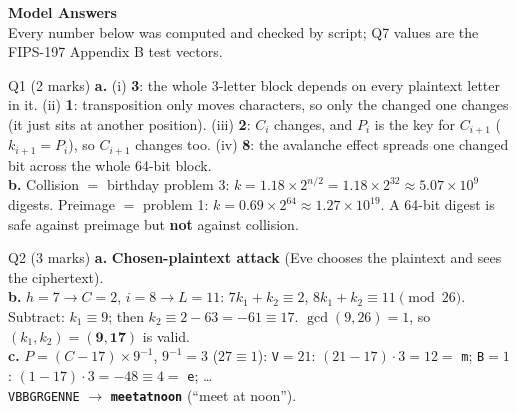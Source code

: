 \documentclass[11pt,a4paper]{article}
\newcommand{\ttx}[1]{\texttt{#1}}
\begin{document}
\clearpage
{\solfont
\pagecolor{tbg}\color{tfg}
{\Large\bfseries\color{acc} Model Answers}\\[2pt]
{\small Every number below was computed and checked by script; Q7 values are the FIPS-197 Appendix B test vectors.}

\begin{sol}{Q1 (2 marks)}
\textbf{a.} (i) \textbf{3}: the whole 3-letter block depends on every plaintext letter in it. (ii) \textbf{1}: transposition only moves characters, so only the changed one changes (it just sits at another position). (iii) \textbf{2}: $C_i$ changes, and $P_i$ is the key for $C_{i+1}$ ($k_{i+1} = P_i$), so $C_{i+1}$ changes too. (iv) \textbf{8}: the avalanche effect spreads one changed bit across the whole 64-bit block.\\
\textbf{b.} Collision $=$ birthday problem 3: $k = 1.18 \times 2^{n/2} = 1.18 \times 2^{32} \approx 5.07 \times 10^{9}$ digests. Preimage $=$ problem 1: $k = 0.69 \times 2^{64} \approx 1.27 \times 10^{19}$. A 64-bit digest is safe against preimage but \textbf{not} against collision.
\end{sol}

\begin{sol}{Q2 (3 marks)}
\textbf{a.} \textbf{Chosen-plaintext attack} (Eve chooses the plaintext and sees the ciphertext).\\
\textbf{b.} $h = 7 \to C = 2$, $i = 8 \to L = 11$: \;$7k_1 + k_2 \equiv 2$, \;$8k_1 + k_2 \equiv 11 \pmod{26}$. Subtract: $k_1 \equiv 9$; then $k_2 \equiv 2 - 63 = -61 \equiv 17$. $\gcd(9, 26) = 1$, so $(k_1, k_2) = \mathbf{(9, 17)}$ is valid.\\
\textbf{c.} $P = (C - 17) \times 9^{-1}$, $9^{-1} = 3$ ($27 \equiv 1$): \;\ttx{V}$=21$: $(21 - 17) \cdot 3 = 12 = $ \ttx{m}; \;\ttx{B}$=1$: $(1 - 17) \cdot 3 = -48 \equiv 4 = $ \ttx{e}; \dots\\
\ttx{VBBGRGENNE} $\to$ \textbf{\ttx{meetatnoon}} (``meet at noon'').
\end{sol}

}
\end{document}
